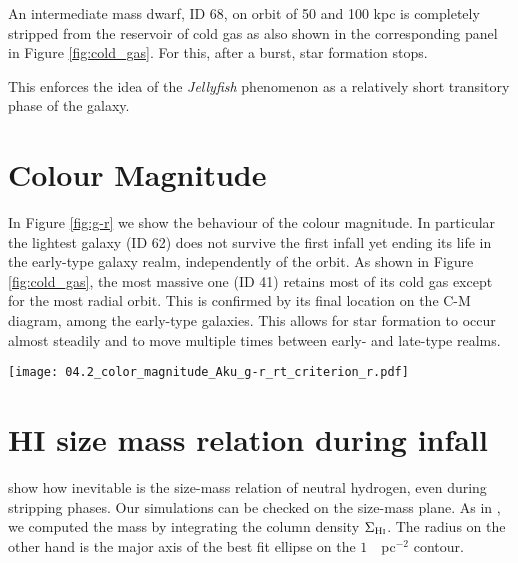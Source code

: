 An intermediate mass dwarf, ID 68, on orbit of 50 and 100 kpc is completely stripped from the reservoir of cold gas as also shown in the corresponding panel in Figure \ref{fig:cold_gas}. For this, after a burst, star formation stops.

This enforces the idea of the \emph{Jellyfish} phenomenon as a relatively short transitory phase of the galaxy. 


\section{Colour Magnitude}
In Figure \ref{fig:g-r} we show the behaviour of the colour magnitude.
In particular the lightest galaxy (ID 62) does not survive the first infall yet ending its life in the early-type galaxy realm, independently of the orbit.
As shown in Figure \ref{fig:cold_gas}, the most massive one (ID 41) retains most of its cold gas except for the most radial orbit.
This is confirmed by its final location on the C-M diagram, among the early-type galaxies.
This allows for star formation to occur almost steadily and to move multiple times between early- and late-type realms.


\begin{sidewaysfigure}
\centering
\texttt{[image: 04.2\_color\_magnitude\_Aku\_g-r\_rt\_criterion\_r.pdf]}
\caption{SDSS bands colour magnitude diagram of galaxies on different orbits compared to Fornax dwarf catalogue of \citet{Venhola2019}.
Red and blue colour for the data points in the background represent dwarf elliptical (dE) and late type galaxy respectively, classified by eye on the base of morphology.
Empty squares are nucleated dE.
Data tracks of simulated galaxies are shown overlaid colour coded by the clustercentric radius.
The tracks are limited to bound galaxies i.e. they are drawn with snapshots for which condition \eqref{eq:tidal_radius_condition} holds.
}
\label{fig:g-r}
\end{sidewaysfigure}

\section{HI size mass relation during infall}
\citet{Stevens2019} show how inevitable is the size-mass relation of neutral hydrogen, even during stripping phases.
Our simulations can be checked on the size-mass plane.
As in \citet{Verbeke2017}, we computed the \Hi{} mass by integrating the \Hi{} column density $\Sigma_{\text{H\textsc{i}}}$. The radius on the other hand is the major axis of the best fit ellipse on the $1$~\Msun{}~pc$^{-2}$ contour.


